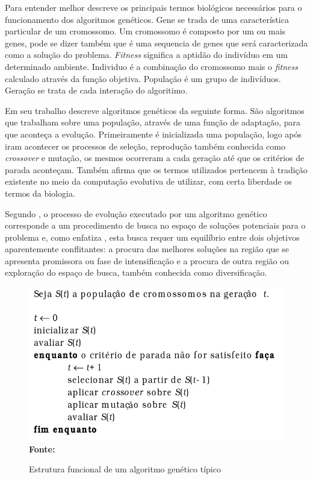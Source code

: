 Para entender melhor \cite{mitchell1998introduction} descreve os principais termos biológicos necessários para o funcionamento dos algoritmos genéticos. Gene se trada de uma característica particular de um cromossomo. Um cromossomo é composto por um ou mais genes, pode se dizer também que é uma sequencia de genes que será caracterizada como a solução do problema. \textit{Fitness} significa a aptidão do indivíduo em um determinado ambiente. Individuo é a combinação do cromossomo mais o \textit{fitness} calculado através da função objetiva. População é um grupo de indivíduos. Geração se trata de cada interação do algoritimo.\par

Em seu trabalho \cite{lucas2000algoritmos} descreve algoritmos genéticos da seguinte forma. São algoritmos que trabalham sobre uma população, através de uma função de adaptação, para que aconteça a evolução. Primeiramente é inicializada uma população, logo após iram acontecer os processos de seleção, reprodução também conhecida como \textit{crossover} e mutação, os mesmos ocorreram a cada geração até que os critérios de parada aconteçam. Também afirma que os termos utilizados pertencem à tradição existente no meio da computação evolutiva de utilizar, com certa liberdade os termos da biologia.

Segundo \cite{oliveira2005algoritmo}, o processo de evolução executado por um algoritmo genético corresponde a um procedimento de busca no espaço de soluções potenciais para o problema e, como enfatiza \cite{michalewicz1996evolutionary}, esta busca requer um equilíbrio entre dois objetivos aparentemente conflitantes: a procura das melhores soluções na região que se apresenta promissora ou fase de intensificação e a procura de outra região ou exploração do espaço de busca, também conhecida como diversificação.\par

\begin{figure}[!htb]
\caption[Estrutura funcional de um algoritmo genético típico]{Estrutura funcional de um algoritmo genético típico}
\label{fig:ag}
\centering
\includegraphics[scale=0.6]{imagens/ag.png}
\\ \textbf{\footnotesize Fonte: \cite{de1999introduccao}}
\end{figure}

